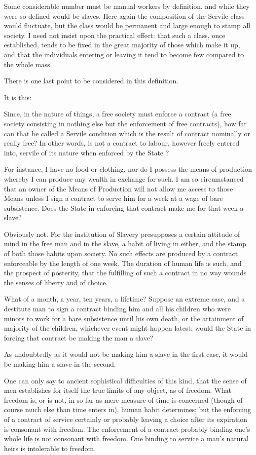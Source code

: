 \documentclass{book}
\begin{document}
Some considerable number must be manual workers by definition, and while they were so defined would be slaves. Here again the composition of the Servile class would fluctuate, but the class would be permanent and large enough to stamp all society. I need not insist upon the practical effect: that such a class, once established, tends to be fixed in the great majority of those which make it up, and that the individuals entering or leaving it tend to become few compared to the whole mass.

There is one last point to be considered in this definition.

It is this:

Since, in the nature of things, a free society must enforce a contract (a free society consisting in nothing else but the enforcement of free contracts), how far can that be called a Servile condition which is the result of contract nominally or really free? In other words, is not a contract to labour, however freely entered into, servile of its nature when enforced by the State ?

For instance, I have no food or clothing, nor do I possess the means of production whereby I can produce any wealth in exchange for such. I am so circumstanced that an owner of the Means of Production will not allow me access to those Means unless I sign a contract to serve him for a week at a wage of bare subsistence. Does the State in enforcing that contract make me for that week a slave?

Obviously not. For the institution of Slavery presupposes a certain attitude of mind in the free man and in the slave, a habit of living in either, and the stamp of both those habits upon society. No such effects are produced by a contract enforceable by the length of one week. The duration of human life is such, and the prospect of posterity, that the fulfilling of such a contract in no way wounds the senses of liberty and of choice.

What of a month, a year, ten years, a lifetime? Suppose an extreme case, and a destitute man to sign a contract binding him and all his children who were minors to work for a bare subsistence until his own death, or the attainment of majority of the children, whichever event might happen latest; would the State in forcing that contract be making the man a slave?

As undoubtedly as it would not be making him a slave in the first case, it would be making him a slave in the second.

One can only say to ancient sophistical difficulties of this kind, that the sense of men establishes for itself the true limits of any object, as of freedom. What freedom is, or is not, in so far as mere measure of time is concerned (though of course much else than time enters in), human habit determines; but the enforcing of a contract of service certainly or probably leaving a choice after its expiration is consonant with freedom. The enforcement of a contract probably binding one’s whole life is not consonant with freedom. One binding to service a man’s natural heirs is intolerable to freedom.
\end{document}

